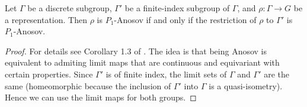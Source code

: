 \documentclass{report}
\begin{document}
\begin{itemize}
    Let $\Gamma$ be a discrete subgroup, $\Gamma'$ be a finite-index subgroup of $\Gamma$, and $\rho: \Gamma \to G$ be a representation.
    Then $\rho$ is $P_1$-Anosov if and only if the restriction of $\rho$ to $\Gamma'$ is $P_1$-Anosov.

    \begin{proof}
        For details see Corollary 1.3 of \cite{guichard2012anosov}.
        The idea is that being Anosov is equivalent to admiting limit maps that are continuous and equivariant with certain properties.
        Since $\Gamma'$ is of finite index, the limit sets of $\Gamma$ and $\Gamma'$ are the same (homeomorphic because the inclusion of $\Gamma'$ into $\Gamma$ is a quasi-isometry).
        Hence we can use the limit maps for both groups.
    \end{proof}
\end{itemize}
\end{document}
